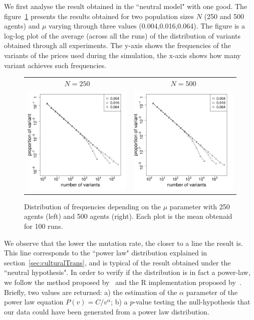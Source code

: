 \documentclass{wscpaperproc}
\begin{document}
We first analyse the result obtained in the ``neutral model" with one good. The figure~\ref{fig:allMutation} presents the results obtained for two population sizes $N$	 (250 and 500 agents) and $\mu$ varying through three values (0.004,0.016,0.064). The figure is a log-log plot of the average (across all the runs) of the distribution of variants obtained through all experiments. The y-axis shows the frequencies of the variants of the prices used during the simulation, the x-axis shows how many variant achieves such frequencies.

\begin{figure}[!h]
	\centering
	\begin{tabular}{ c c}
		 $N=250$ & $N=500$ \\
		\includegraphics[width=6cm]{img/allmuRandMaxN250.pdf}&
		\includegraphics[width=6cm]{img/allmuRandMaxN500.pdf}
	\end{tabular}
	\caption{Distribution of frequencies depending on the $\mu$ parameter with 250 agents (left) and 500 agents (right). Each plot is the mean obtenaid for 100 runs.\label{fig:allMutation}}
\end{figure}

We observe that the lower the mutation rate, the closer to a line the result is. This line corresponds to the ``power law" distribution explained in section~\ref{sec:culturalTrans}, and is typical of the result obtained under the ``neutral hypothesis". In order to verify if the distribution is in fact a power-law, we follow the method proposed by~\cite{clauset2009powerlawdistributionsinempiricaldat} and the R implementation proposed by~\cite{gillespie_fitting_2015}. Briefly, two values are returned: a) the estimation of the $\alpha$ parameter of the power law equation $P(v)=C/v^\alpha $; b) a $p$-value testing the null-hypothesis that our data could have been generated from a power law distribution.
\end{document}
